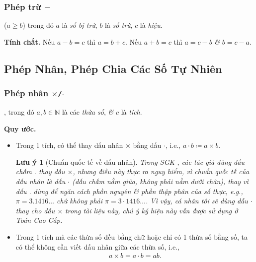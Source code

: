 \documentclass{article}
\numberwithin{equation}{section}
\newtheorem{remark}{Lưu ý}[section]
\begin{document}
\subsubsection{Phép trừ $-$}
 ($a\ge b$) trong đó $a$ là \textit{số bị trừ}, $b$ là \textit{số trừ}, $c$ là \textit{hiệu}.

\noindent\textbf{Tính chất.} Nếu $a - b = c$ thì $a = b + c$. Nếu $a + b = c$ thì $a = c - b$ \textit{\&} $b = c - a$.

\subsection{Phép Nhân, Phép Chia Các Số Tự Nhiên}

\subsubsection{Phép nhân $\times$\texttt{/}$\cdot$}
, trong đó $a,b\in\mathbb{N}$ là các \textit{thừa số}, \textit{\&} $c$ là \textit{tích}.

\noindent\textbf{Quy ước.}
\begin{itemize}
	\item Trong 1 tích, có thể thay dấu nhân $\times$ bằng dấu $\cdot$, i.e., $a\cdot b\coloneqq a\times b$.
	
	\begin{remark}[Chuẩn quốc tế về dấu nhân]
		Trong SGK \cite[p. 18]{Thai_Anh_Dat_Ha_Loan_Nam_Quang_Toan_6_tap_1}, các tác giả dùng dấu chấm $.$ thay dấu $\times$, nhưng điều này thực ra nguy hiểm, vì chuẩn quốc tế của dấu nhân là dấu $\cdot$ (dấu chấm nằm giữa, không phải nằm dưới chân), thay vì dấu $.$ dùng để ngăn cách phần nguyên \textit{\&} phần thập phân của số thực, e.g., $\pi = 3.1416\ldots$ chứ không phải $\pi = 3\cdot 1416\ldots$. Vì vậy, cá nhân tôi sẽ dùng dấu $\cdot$ thay cho dấu $\times$ trong tài liệu này, chú ý ký hiệu này vẫn được sử dụng ở Toán Cao Cấp.
	\end{remark}
	\item Trong 1 tích mà các thừa số đều bằng chữ hoặc chỉ có 1 thừa số bằng số, ta có thể không cần viết dấu nhân giữa các thừa số, i.e.,
	\begin{align*}
		a\times b = a\cdot b = ab.
	\end{align*}
\end{itemize}
\end{document}
